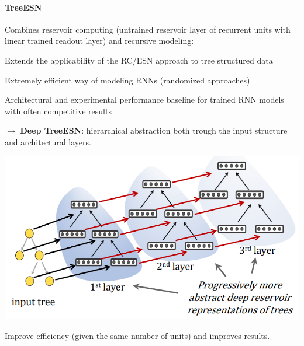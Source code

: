 \documentclass[10pt]{report}
\begin{document}
\paragraph{TreeESN} Combines reservoir computing (untrained reservoir layer of recurrent units with linear trained readout layer) and recursive modeling:
\begin{list}{}{}
	\item Extends the applicability of the RC/ESN approach to tree structured data
	\item Extremely efficient way of modeling RNNs (randomized approaches)
	\item Architectural and experimental performance baseline for trained RNN models with often competitive results
\end{list}
$\rightarrow$ \textbf{Deep TreeESN}: hierarchical abstraction both trough the input structure and architectural layers.
\begin{center}
	\includegraphics[scale=0.5]{45.png}
\end{center}
Improve efficiency (given the same number of units) and improves results.
\end{document}
